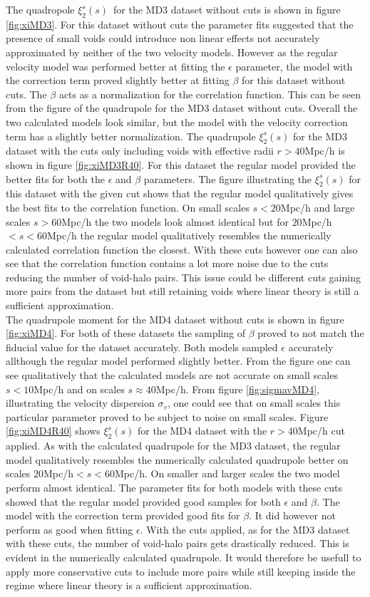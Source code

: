 The quadropole $\xi_2^s(s)$ for the MD3 dataset without cuts is shown in figure \ref{fig:xiMD3}. For this dataset without cuts the parameter fits suggested that the presence of small voids could introduce non linear effects not accurately approximated by neither of the two velocity models. However as the regular velocity model was performed better at fitting the $\epsilon$ parameter, the model with the correction term proved slightly better at fitting $\beta$ for this dataset without cuts. The $\beta$ acts as a normalization for the correlation function. This can be seen from the figure of the quadrupole for the MD3 dataset without cuts. Overall the two calculated models look similar, but the model with the velocity correction term has a slightly better normalization. The quadrupole $\xi_2^s(s)$ for the MD3 dataset with the cuts only including voids with effective radii $r>40$Mpc/h is shown in figure \ref{fig:xiMD3R40}. For this dataset the regular model provided the better fits for both the $\epsilon$ and $\beta$ parameters. The figure illustrating the $\xi_2^s(s)$ for this dataset with the given cut shows that the regular model qualitatively gives the best fits to the correlation function. On small scales $s<20$Mpc/h and large scales $s>60$Mpc/h the two models look almost identical but for $20$Mpc/h$<s<60$Mpc/h the regular model qualitatively resembles the numerically calculated correlation function the closest. With these cuts however one can also see that the correlation function contains a lot more noise due to the cuts reducing the number of void-halo pairs. This issue could be different cuts gaining more pairs from the dataset but still retaining voids where linear theory is still a sufficient approximation.\\\indent
The quadrupole moment for the MD4 dataset without cuts is shown in figure \ref{fig:xiMD4}. For both of these datasets the sampling of $\beta$ proved to not match the fiducial value for the dataset accurately. Both models sampled $\epsilon$ accurately allthough the regular model performed slightly better. From the figure one can see qualitatively that the calculated models are not accurate on small scales $s<10$Mpc/h and on scales $s\approx40$Mpc/h. From figure \ref{fig:sigmavMD4}, illustrating the velocity dispersion $\sigma_v$, one could see that on small scales this particular parameter proved to be subject to noise on small scales. Figure \ref{fig:xiMD4R40} shows $\xi_2^s(s)$ for the MD4 dataset with the $r>40$Mpc/h cut applied. As with the calculated quadrupole for the MD3 dataset, the regular model qualitatively resembles the numerically calculated quadrupole better on scales $20$Mpc/h$<s<60$Mpc/h. On smaller and larger scales the two model perform almost identical. The parameter fits for both models with these cuts showed that the regular model provided good samples for both $\epsilon$ and $\beta$. The model with the correction term provided good fits for $\beta$. It did however not perform as good when fitting $\epsilon$. With the cuts applied, as for the MD3 dataset with these cuts, the number of void-halo pairs gets drastically reduced. This is evident in the numerically calculated quadrupole. It would therefore be usefull to apply more conservative cuts to include more pairs while still keeping inside the regime where linear theory is a sufficient approximation.

